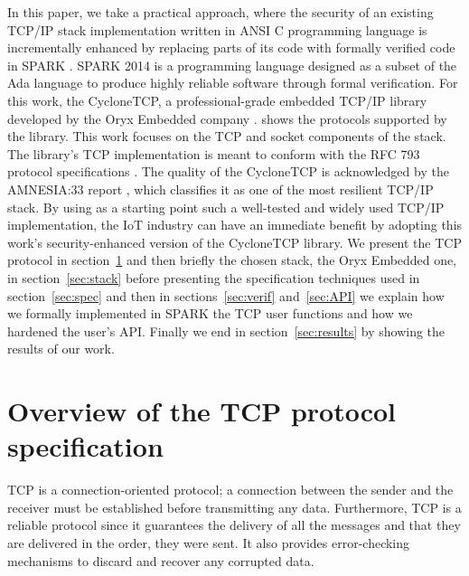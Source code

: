 \documentclass[conference]{IEEEtran}
\begin{document}
In this paper, we take a practical approach, where the security of an existing TCP/IP stack implementation written in ANSI C programming language is incrementally enhanced by replacing parts of its code with formally verified code in SPARK \cite{mccormick_chapin_2015}. SPARK 2014 is a programming language designed as a subset of the Ada language to produce highly reliable software through formal verification. For this work, the CycloneTCP, a professional-grade embedded TCP/IP library developed by the Oryx Embedded company \cite{CycloneTCP}.  shows the protocols supported by the library. This work focuses on the TCP and socket components of the stack. The library's TCP implementation is meant to conform with the RFC 793 protocol specifications \cite{rfc793}. The quality of the CycloneTCP is acknowledged by the AMNESIA:33 report \cite{AMNESIA33}, which classifies it as one of the most resilient TCP/IP stack. By using as a starting point such a well-tested and widely used TCP/IP implementation, the IoT industry can have an immediate benefit by adopting this work's security-enhanced version of the CycloneTCP library.
We present the TCP protocol in section~\ref{sec:TCP} and then briefly the
chosen stack, the Oryx Embedded one, in section~\ref{sec:stack}
before presenting the specification techniques used in section~\ref{sec:spec}
and then in sections~\ref{sec:verif} and~\ref{sec:API} we explain how we
formally implemented in SPARK the TCP user functions and how we hardened the
user's API. Finally we end in section~\ref{sec:results} by showing the results
of our work.

\section{Overview of the TCP protocol specification}
\label{sec:TCP}



TCP is a connection-oriented protocol; a connection between the sender and the receiver must be established before transmitting any data. Furthermore, TCP is a reliable protocol since it guarantees the delivery of all the messages and that they are delivered in the order, they were sent. It also provides error-checking mechanisms to discard and recover any corrupted data.

\end{document}
